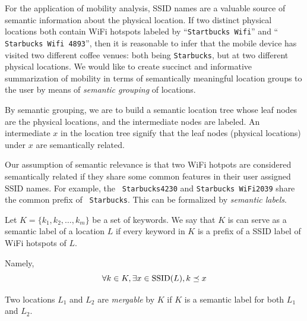 For the application of mobility analysis, SSID names are a valuable source of
semantic information about the physical location.  If two distinct physical
locations
both contain WiFi hotspots labeled by ``{\tt Startbucks Wifi}'' and ``{\tt
Starbucks Wifi 4893}'', then it is reasonable to infer that the mobile device
has visited two different coffee venues: both being {\tt Starbucks}, but at two
different physical locations.  
We would like to create succinct and informative
summarization of mobility in terms of semantically meaningful location groups to
the user by means of {\em semantic grouping} of locations.

By semantic grouping, we are to build a semantic location tree whose leaf nodes are the physical
locations, and the intermediate nodes are labeled.  An intermediate $x$ in the
location tree signify that the leaf nodes (physical locations) under $x$ are
semantically related.

Our assumption of semantic relevance is that
two WiFi hotpots are considered semantically related if they share some common
features in their user assigned SSID names.  For example, the {\tt
Starbucks4230} and {\tt Starbucks WiFi2039} share the common prefix of {\tt
Starbucks}.  This can be formalized by {\em semantic labels}.

\begin{definition}
    Let $K = \{k_1, k_2, \dots, k_m\}$ be a set of keywords.
    We say that $K$ is can serve as a semantic label of a location $L$ if every
    keyword in $K$ is a prefix of a SSID label of WiFi hotspots of $L$.

    Namely,
    $$ \forall k\in K, \exists x\in\mathrm{SSID}(L), k\preceq x$$

    Two locations $L_1$ and $L_2$ are {\em mergable} by $K$ if $K$ is a semantic
    label for both $L_1$ and $L_2$.
\end{definition}

